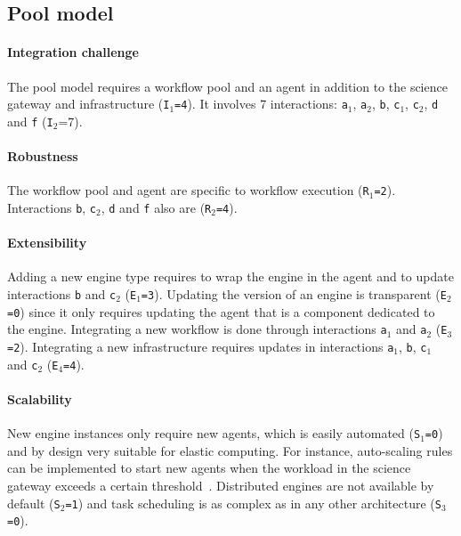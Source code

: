 \documentclass[preprint,3p,twocolumn]{elsarticle}
\begin{document}
\subsection{Pool model}

\paragraph{Integration challenge} The pool model requires a workflow pool and an
agent in addition to the science gateway and infrastructure
(\texttt{I$_1$=4}). It involves 7 interactions: \texttt{a$_1$},
\texttt{a$_2$}, \texttt{b}, \texttt{c$_1$}, \texttt{c$_2$}, \texttt{d}
and \texttt{f} (\texttt{I$_2$}=7).

\paragraph{Robustness} The workflow pool and agent are specific to
workflow execution (\texttt{R$_1$=2}). Interactions \texttt{b},
\texttt{c$_2$}, \texttt{d} and \texttt{f} also are (\texttt{R$_2$=4}).

\paragraph{Extensibility} Adding a new engine type requires to wrap
the engine in the agent and to update interactions \texttt{b} and
\texttt{c$_2$} (\texttt{E$_1$=3}). Updating the version of an engine
is transparent (\texttt{E$_2$=0}) since it only requires updating the
agent that is a component dedicated to the engine. Integrating a new workflow is
done through interactions \texttt{a$_1$} and \texttt{a$_2$}
(\texttt{E$_3$=2}). Integrating a new infrastructure requires updates
in interactions \texttt{a$_1$}, \texttt{b}, \texttt{c$_1$} and \texttt{c$_2$}
(\texttt{E$_4$=4}).

\paragraph{Scalability} New engine instances only require new agents,
which is easily automated (\texttt{S$_1$=0}) and by design very
suitable for elastic computing. For instance, auto-scaling rules can
be implemented to start new agents when the workload in the science
gateway exceeds a certain threshold~\cite{lorido2012auto}. Distributed
engines are not available by default (\texttt{S$_2$=1}) and task
scheduling is as complex as in any other architecture
(\texttt{S$_3$=0}).
\end{document}
